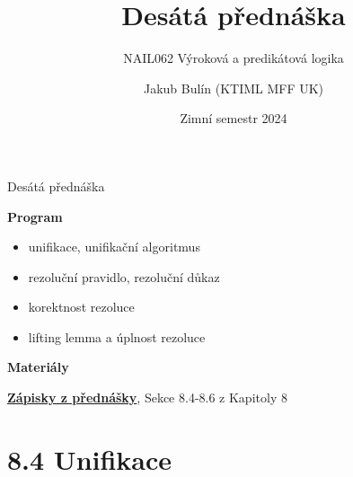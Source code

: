 \documentclass{beamer}
\title{Desátá přednáška}
\subtitle{NAIL062 Výroková a predikátová logika}
\author{Jakub Bulín (KTIML MFF UK)}
\date{Zimní semestr 2024}
\begin{document}
\maketitle


\begin{frame}{Desátá přednáška}

    \textbf{Program}
        \begin{itemize}            
            \item unifikace, unifikační algoritmus
            \item rezoluční pravidlo, rezoluční důkaz
            \item korektnost rezoluce
            \item lifting lemma a úplnost rezoluce
        \end{itemize}    

    \textbf{Materiály}

        \href{https://github.com/jbulin-mff-uk/nail062/raw/main/lecture/lecture-notes/lecture-notes.pdf}{\alert{\textbf{Zápisky z přednášky}}}, Sekce 8.4-8.6 z Kapitoly 8

\end{frame}


\section{8.4 Unifikace}
\end{document}
